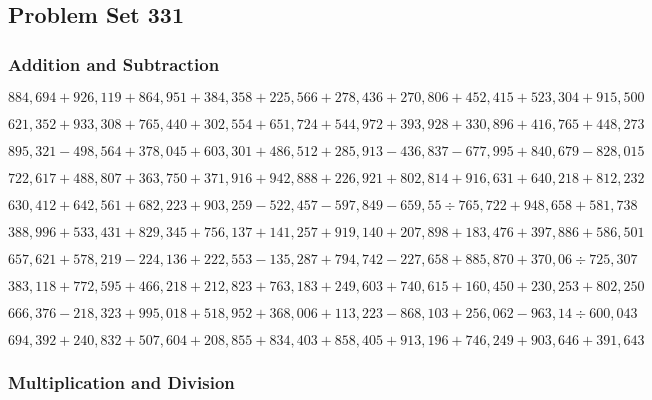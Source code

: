\hypertarget{problem-set-331}{%
\subsection{Problem Set 331}\label{problem-set-331}}

\hypertarget{addition-and-subtraction}{%
\subsubsection{Addition and
Subtraction}\label{addition-and-subtraction}}

\(884,694+926,119+864,951+384,358+225,566+278,436+270,806+452,415+523,304+915,500\)

\(621,352+933,308+765,440+302,554+651,724+544,972+393,928+330,896+416,765+448,273\)

\(895,321-498,564+378,045+603,301+486,512+285,913-436,837-677,995+840,679-828,015\)

\(722,617+488,807+363,750+371,916+942,888+226,921+802,814+916,631+640,218+812,232\)

\(630,412+642,561+682,223+903,259-522,457-597,849-659,55÷765,722+948,658+581,738\)

\(388,996+533,431+829,345+756,137+141,257+919,140+207,898+183,476+397,886+586,501\)

\(657,621+578,219-224,136+222,553-135,287+794,742-227,658+885,870+370,06÷725,307\)

\(383,118+772,595+466,218+212,823+763,183+249,603+740,615+160,450+230,253+802,250\)

\(666,376-218,323+995,018+518,952+368,006+113,223-868,103+256,062-963,14÷600,043\)

\(694,392+240,832+507,604+208,855+834,403+858,405+913,196+746,249+903,646+391,643\)

\hypertarget{multiplication-and-division}{%
\subsubsection{Multiplication and
Division}\label{multiplication-and-division}}

